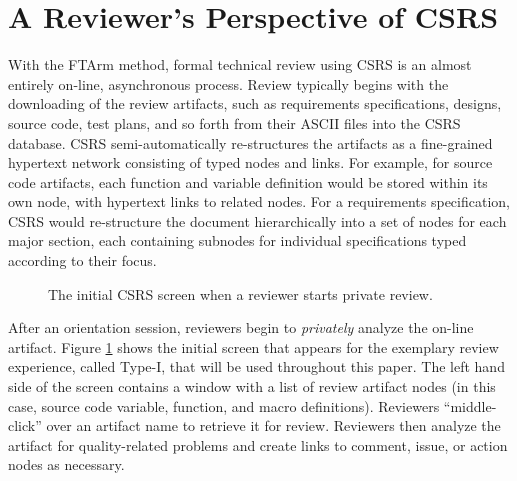 
\section{A Reviewer's Perspective of CSRS}
\label{sec:csrs}

With the FTArm method, formal technical review using CSRS is an almost entirely on-line,
asynchronous process.  Review typically begins with the downloading of
the review artifacts, such as requirements specifications, designs, source
code, test plans, and so forth from their ASCII files into the CSRS
database.  CSRS semi-automatically re-structures the artifacts as a
fine-grained hypertext network consisting of typed nodes and links. For
example, for source code artifacts, each function and variable definition
would be stored within its own node, with hypertext links to related nodes.
For a requirements specification, CSRS would re-structure the document
hierarchically into a set of nodes for each major section, each containing
subnodes for individual specifications typed according to their focus.

\begin{figure}
 {\centerline{}}
\caption{The initial CSRS screen when a reviewer starts private review.}
\label{fig:initial-screen}
\end{figure}

After an orientation session, reviewers begin to {\em privately} analyze
the on-line artifact.  Figure \ref{fig:initial-screen} shows the initial
screen that appears for the exemplary review experience, called Type-I,
that will be used throughout this paper. The left hand side
of the screen contains a window with a list of review artifact nodes (in
this case, source code variable, function, and macro definitions).
Reviewers ``middle-click'' over an artifact name to retrieve it for review.
Reviewers then analyze the artifact for quality-related problems and create
links to comment, issue, or action nodes as necessary.

